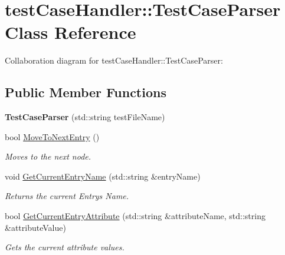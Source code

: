 \hypertarget{classtestCaseHandler_1_1TestCaseParser}{}\section{test\+Case\+Handler\+::Test\+Case\+Parser Class Reference}
\label{classtestCaseHandler_1_1TestCaseParser}


Collaboration diagram for test\+Case\+Handler\+::Test\+Case\+Parser\+:
\subsection*{Public Member Functions}
\begin{DoxyCompactItemize}
\item 
\mbox{\label{classtestCaseHandler_1_1TestCaseParser_a9f968bedd29322529061e99701c952c9}} 
{\bfseries Test\+Case\+Parser} (std\+::string test\+File\+Name)
\item 
\mbox{\label{classtestCaseHandler_1_1TestCaseParser_ab20f93aa275404b1214db99f6076ad6c}} 
bool \mbox{\hyperlink{classtestCaseHandler_1_1TestCaseParser_ab20f93aa275404b1214db99f6076ad6c}{Move\+To\+Next\+Entry}} ()
\begin{DoxyCompactList}\small\item\em Moves to the next node. \end{DoxyCompactList}\item 
\mbox{\label{classtestCaseHandler_1_1TestCaseParser_a3a6983aef38273c881a5a918ab8d706c}} 
void \mbox{\hyperlink{classtestCaseHandler_1_1TestCaseParser_a3a6983aef38273c881a5a918ab8d706c}{Get\+Current\+Entry\+Name}} (std\+::string \&entry\+Name)
\begin{DoxyCompactList}\small\item\em Returns the current Entry\textquotesingle{}s Name. \end{DoxyCompactList}\item 
bool \mbox{\hyperlink{classtestCaseHandler_1_1TestCaseParser_a7d868f50a4cc167300b5e68fd3b54a6d}{Get\+Current\+Entry\+Attribute}} (std\+::string \&attribute\+Name, std\+::string \&attribute\+Value)
\begin{DoxyCompactList}\small\item\em Gets the current attribute values. \end{DoxyCompactList}\item 

\end{DoxyCompactItemize}
